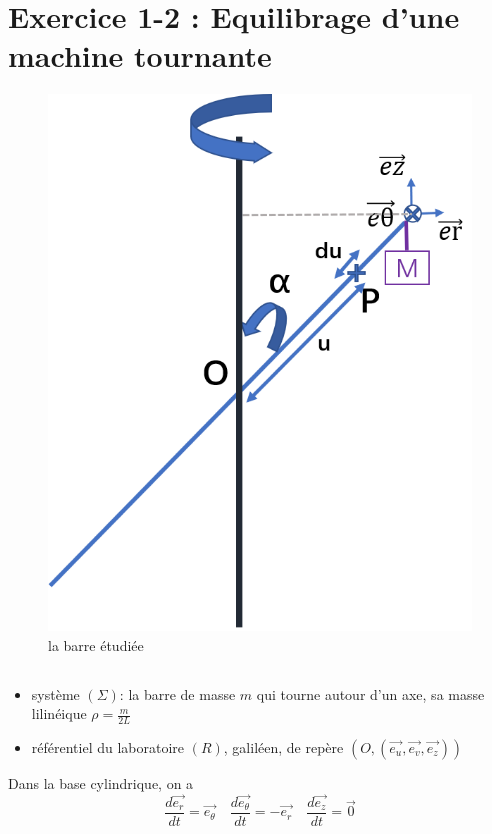 \documentclass[a4paper,12pt]{book}
\begin{document}
\renewcommand{\labelitemi}{$\blacktriangleright$}
\renewcommand{\labelitemii}{$\bullet$}


\section{Exercice 1-2 : Equilibrage d'une machine tournante}
\begin{figure}[h]
    \begin{center}
    \includegraphics[scale=0.6]{meca2.png}
    \end{center}
    \caption{la barre étudiée}
\end{figure}
\subsection{}
\begin{itemize}
    \item système $(\Sigma)$: la barre de masse $m$ qui tourne autour d'un axe, sa masse lilinéique $\rho=\frac{m}{2L}$
    \item référentiel du laboratoire $(R)$, galiléen, de repère $(O,(\vec{e_u},\vec{e_v},\vec{e_z}))$
\end{itemize}
Dans la base cylindrique, on a 
$$
\frac{d\vec{e_r}}{dt}=\vec{e_\theta}\quad \frac{d\vec{e_\theta}}{dt}=-\vec{e_r}\quad \frac{d\vec{e_z}}{dt}=\vec{0} 
$$
\end{document}
